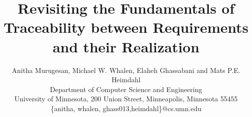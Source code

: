 \documentclass{IEEEtran}
\begin{document}
    \newcommand{\mike}[1]{\textcolor{green}{\emph {Mike: #1}}}
    \newcommand{\mats}[1]{\textcolor{blue}{\sc Mats: #1}}
    \newcommand{\sanjai}[1]{\textcolor{magenta}{\sc Sanjai: #1}}
    \newcommand{\anitha}[1]{\textcolor{red}{\emph {Anitha: #1}}}
    \newcommand{\req}[1]{\textcolor{blue}{\begin{quotation}\emph{#1}\end{quotation}}} %
    \newcommand{\eq}[1]{\textcolor{blue}{\begin{equation} #1\end{equation}}}
    \sloppypar


\title{Revisiting the Fundamentals of Traceability between Requirements and their Realization}

\author{Anitha Murugesan, Michael W. Whalen, Elaheh Ghassabani and Mats P.E. Heimdahl \\
      {Department of Computer Science and Engineering}\\
      {University of Minnesota, 200 Union Street, Minneapolis, Minnesota 55455}\\
      {\{anitha, whalen, ghass013,heimdahl\}@cs.umn.edu}
}

    \maketitle


    
    
    
    
%    
%    
    

%    
%    

%

\newpage


\end{document}
